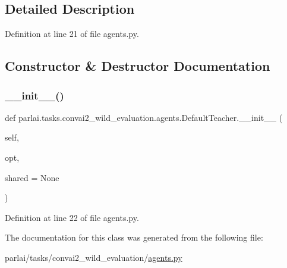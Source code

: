 \subsection{Detailed Description}


Definition at line 21 of file agents.\+py.



\subsection{Constructor \& Destructor Documentation}
\mbox{\label{classparlai_1_1tasks_1_1convai2__wild__evaluation_1_1agents_1_1DefaultTeacher_a0952cee2a6035fb39bfba3ad0c04b8c3}} 
\subsubsection{\texorpdfstring{\+\_\+\+\_\+init\+\_\+\+\_\+()}{\_\_init\_\_()}}
{\footnotesize\ttfamily def parlai.\+tasks.\+convai2\+\_\+wild\+\_\+evaluation.\+agents.\+Default\+Teacher.\+\_\+\+\_\+init\+\_\+\+\_\+ (\begin{DoxyParamCaption}\item[{}]{self,  }\item[{}]{opt,  }\item[{}]{shared = {\ttfamily None} }\end{DoxyParamCaption})}



Definition at line 22 of file agents.\+py.



The documentation for this class was generated from the following file\+:\begin{DoxyCompactItemize}
\item 
parlai/tasks/convai2\+\_\+wild\+\_\+evaluation/\hyperlink{parlai_2tasks_2convai2__wild__evaluation_2agents_8py}{agents.\+py}\end{DoxyCompactItemize}
